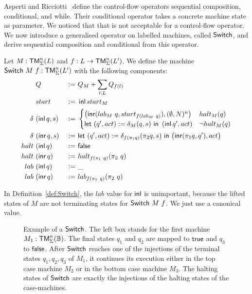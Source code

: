 Asperti and Ricciotti~\cite{asperti2015} define the control-flow operators sequential composition, conditional, and while.  Their conditional operator
takes a concrete machine state as parameter.  We noticed that that is not acceptable for a control-flow operator.  We now introduce a generalised
operator on labelled machines, called $\mathsf{Switch}$, and derive sequential composition and conditional from this operator.

\begin{definition}[$\MS{Switch}~M~f$][Switch]
  \label{def:Switch}
  Let $M : \mathsf{TM}_\Sigma^n(L)$ and $f : L \rightarrow \mathsf{TM}_\Sigma^n(L')$.  We define the machine $\mathsf{Switch}~M~f : \mathsf{TM}_\Sigma^n(L')$ with the following
  components:
  \begin{alignat*}{3}
    & Q                  &~:=~& Q_M +  \sum_{l:L} Q_{f(l)} \\
    & start              &~:=~& \operatorname{\mathsf{inl}} start_M \\
    \delta ~&(\operatorname{\mathsf{inl}} q, s) &~:=~&
    \begin{cases}
      \bigl(\operatorname{\mathsf{inr}} (lab_M~q, start_{f (lab_M~q)}), (\emptyset, N)^n \bigr) & halt_M(q) \\
      \mathsf{let}~(q', act) := \delta_M(q, s)~\mathsf{in}~\left(\operatorname{\mathsf{inl}} q', act \right) & \lnot halt_M(q)
    \end{cases} \\
    \delta ~&(\operatorname{\mathsf{inr}} q, s) &~:=~& \mathsf{let}~(q', act) := \delta_{f(\pi_1 q)} (\pi_2 q, s)~\mathsf{in}~\bigl( \operatorname{\mathsf{inr}} (\pi_1 q, q'), act \bigr) \\
    halt   ~&(\operatorname{\mathsf{inl}}  q)   &~:=~& \mathsf{false} \\
    halt   ~&(\operatorname{\mathsf{inr}}  q)   &~:=~& halt_{f(\pi_1~q)} (\pi_2~q) \\
    lab   ~&(\operatorname{\mathsf{inl}}  q)   &~:=~& \_ \\
    lab   ~&(\operatorname{\mathsf{inr}}  q)   &~:=~& lab_{f(\pi_1~q)} (\pi_2~q)
  \end{alignat*}
\end{definition}

In Definition~\ref{def:Switch}, the $lab$ value for $\operatorname{\mathsf{inl}}$ is unimportant, because the lifted states of $M$ are not terminating states for
$\MS{Switch}~M~f$.  We just use a canonical value.

\begin{figure}
  \center
  
  \caption{Example of a $\mathsf{Switch}$.  The left box stands for the first machine $M_1:\mathsf{TM}_\Sigma^n(\mathbb{B})$.  The final states $q_1$ and $q_2$ are
    mapped to $\mathsf{true}$ and $q_3$ to $\mathsf{false}$.  After $\mathsf{Switch}$ reaches one of the injections of the terminal states $q_1, q_2, q_3$ of $M_1$, it
    continues its execution either in the top case machine $M_2$ or in the bottom case machine $M_3$.  The halting states of $\mathsf{Switch}$ are exactly
    the injections of the halting states of the case-machines.}
  \label{fig:match}
\end{figure}

